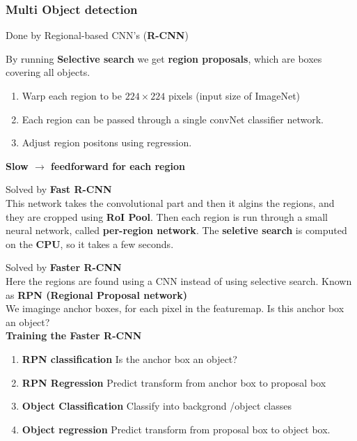 \documentclass[a4paper]{article}
\begin{document}
\subsubsection*{Multi Object detection}
Done by Regional-based CNN's (\textbf{R-CNN}) 

By running \textbf{Selective search} we get \textbf{region proposals}, which are boxes covering all objects.   

\begin{enumerate}
	\item Warp each region to be $ 224 \times 224 $ pixels (input size of ImageNet)
	\item Each region can be passed through a single convNet classifier network.
	\item Adjust region positons using regression.
\end{enumerate}

\textbf{Slow $ \rightarrow $ feedforward for each region} 

\vspace{15pt}


Solved by \textbf{Fast R-CNN}\\
This network takes the convolutional part and then it algins the regions, and they are cropped using \textbf{RoI Pool}. Then each region is run through a small neural network, called \textbf{per-region network}. The \textbf{seletive search} is computed on the \textbf{CPU}, so it takes a few seconds.   


\vspace{15pt}
Solved by \textbf{Faster R-CNN}\\
Here the regions are found using a CNN instead of using selective search. Known as \textbf{RPN (Regional Proposal network)}\\
We imaginge anchor boxes, for each pixel in the featuremap. Is this anchor box an object?\\

\textbf{Training the Faster R-CNN} 
\begin{enumerate}
	\item \textbf{RPN classification} Is the anchor box an object?
	\item \textbf{RPN Regression} Predict transform from anchor box to proposal box
	\item \textbf{Object Classification} Classify into backgrond /object classes
	\item \textbf{Object regression} Predict transform from proposal box to object box. 
\end{enumerate}
\end{document}
